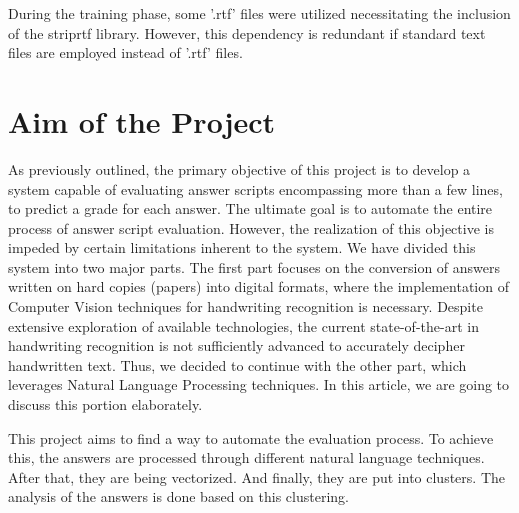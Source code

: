 During the training phase, some '.rtf' files were utilized necessitating the inclusion of the striprtf library. However, this dependency is redundant if standard text files are employed instead of '.rtf' files. 

\section{Aim of the Project}
\par
As previously outlined, the primary objective of this project is to develop a system capable of evaluating answer scripts encompassing more than a few lines, to predict a grade for each answer. The ultimate goal is to automate the entire process of answer script evaluation. However, the realization of this objective is impeded by certain limitations inherent to the system. We have divided this system into two major parts. The first part focuses on the conversion of answers written on hard copies (papers) into digital formats, where the implementation of Computer Vision techniques for handwriting recognition is necessary. Despite extensive exploration of available technologies, the current state-of-the-art in handwriting recognition is not sufficiently advanced to accurately decipher handwritten text. Thus, we decided to continue with the other part, which leverages Natural Language Processing techniques. In this article, we are going to discuss this portion elaborately. 
\par
This project aims to find a way to automate the evaluation process. To achieve this, the answers are processed through different natural language techniques. After that, they are being vectorized. And finally, they are put into clusters. The analysis of the answers is done based on this clustering. 


